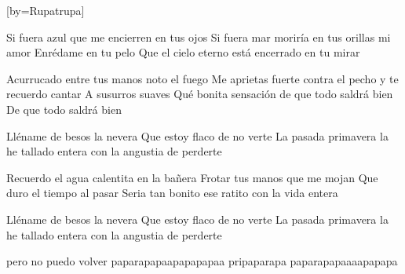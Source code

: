 
[by={Rupatrupa}]

    \usebox{\GSus}\usebox{\Cm}\usebox{\Gm}

    

    \beginverse
        Si fuera azul que me encierren en tus ojos
        Si fuera mar moriría en tus orillas mi amor
        Enrédame en tu pelo
        Que el cielo eterno está encerrado en tu mirar
    \endverse

    \beginverse    
        Acurrucado entre tus manos noto el fuego
        Me aprietas fuerte contra el pecho y te recuerdo cantar
        A susurros suaves
        Qué bonita sensación de que todo saldrá bien
        De que todo saldrá bien
    \endverse

    \beginverse
        Lléname de besos la nevera
        Que estoy flaco de no verte
        La pasada primavera la he tallado entera con la angustia de perderte
    \endverse

    \beginverse
        Recuerdo el agua calentita en la bañera
        Frotar tus manos que me mojan
        Que duro el tiempo al pasar
        Seria tan bonito ese ratito con la vida entera
    \endverse

    \beginverse
        Lléname de besos la nevera
        Que estoy flaco de no verte
        La pasada primavera la he tallado entera con la angustia de perderte
    \endverse

    \beginverse
        pero no puedo volver
        paparapapaapapapapaa
        pripaparapa
        paparapapaaaapapapa
    \endverse

\endsong

\scleardpage